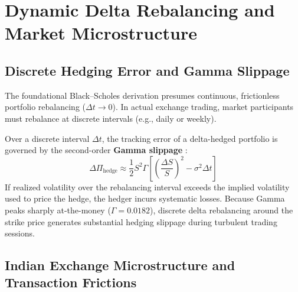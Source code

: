 
\section{Dynamic Delta Rebalancing and Market Microstructure}
\label{sec:dynamic_rebalancing}

\subsection{Discrete Hedging Error and Gamma Slippage}

The foundational Black--Scholes derivation presumes continuous, frictionless portfolio rebalancing ($\Delta t \to 0$). In actual exchange trading, market participants must rebalance at discrete intervals (e.g., daily or weekly). 

Over a discrete interval $\Delta t$, the tracking error of a delta-hedged portfolio is governed by the second-order \textbf{Gamma slippage} \citep{wilmott2006paul}:
\begin{equation}
    \Delta \Pi_{\text{hedge}} \approx \frac{1}{2} S^2 \Gamma \left[ \left( \frac{\Delta S}{S} \right)^2 - \sigma^2 \Delta t \right]
    \label{eq:gamma_slippage}
\end{equation}
If realized volatility over the rebalancing interval exceeds the implied volatility used to price the hedge, the hedger incurs systematic losses. Because Gamma peaks sharply at-the-money ($\Gamma = 0.0182$), discrete delta rebalancing around the strike price generates substantial hedging slippage during turbulent trading sessions.

\subsection{Indian Exchange Microstructure and Transaction Frictions}

